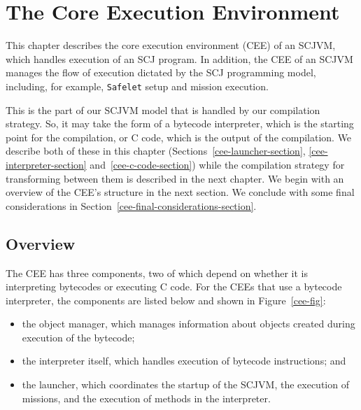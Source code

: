 \chapter{The Core Execution Environment}
\label{cee-chapter}

This chapter describes the core execution environment (CEE) of an
SCJVM, which handles execution of an SCJ program.
In addition, the CEE of an SCJVM manages the flow of execution
dictated by the SCJ programming model, including, for example,
\texttt{Safelet} setup and mission execution.

This is the part of our SCJVM model that is handled by our compilation
strategy. 
So, it may take the form of a bytecode interpreter, which is the
starting point for the compilation, or C code, which is the output of
the compilation.
We describe both of these in this chapter
(Sections~\ref{cee-launcher-section}, \ref{cee-interpreter-section}
and~\ref{cee-c-code-section}) while the compilation strategy for
transforming between them is described in the next chapter.
We begin with an overview of the CEE's structure in the next section.
We conclude with some final considerations in
Section~\ref{cee-final-considerations-section}.

\section{Overview}

The CEE has three components, two of which depend on whether it is
interpreting bytecodes or executing C code. 
For the CEEs that use a bytecode interpreter, the components are
listed below and shown in Figure~\ref{cee-fig}:
\begin{itemize}
\item the object manager, which manages information about objects
  created during execution of the bytecode;
\item the interpreter itself, which handles execution of bytecode
  instructions; and
\item the launcher, which coordinates the startup of the SCJVM, the
  execution of missions, and the execution of methods in the
  interpreter.
\end{itemize}

